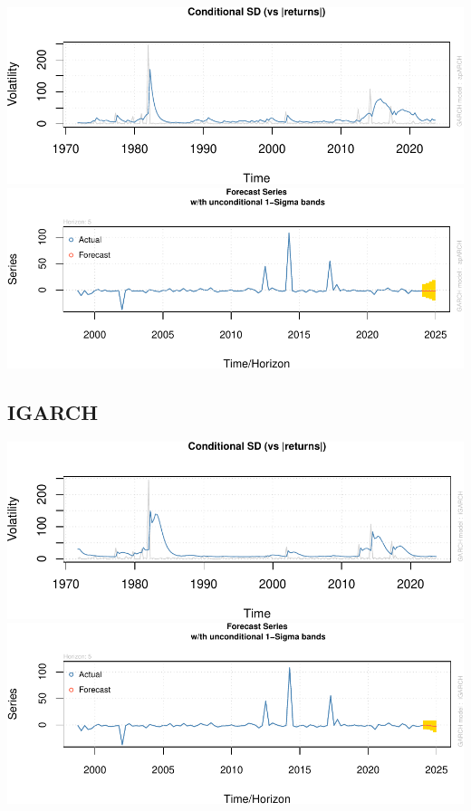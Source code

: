 \documentclass[
  man]{apa6}
\begin{document}
\includegraphics{STAT429Report_files/figure-latex/unnamed-chunk-18-1.pdf} \includegraphics{STAT429Report_files/figure-latex/unnamed-chunk-18-2.pdf}

\subsection{IGARCH}\label{igarch}

\includegraphics{STAT429Report_files/figure-latex/unnamed-chunk-19-1.pdf} \includegraphics{STAT429Report_files/figure-latex/unnamed-chunk-19-2.pdf}
\end{document}
